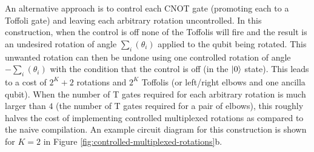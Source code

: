 An alternative approach is to control each CNOT gate (promoting each to a Toffoli gate) and leaving each arbitrary rotation uncontrolled.
In this construction, when the control is off none of the Toffolis will fire and the result is an undesired rotation of angle $\sum_{i} (\theta_i)$ applied to the qubit being rotated.
This unwanted rotation can then be undone using one controlled rotation of angle $- \sum_{i} (\theta_i)$ with the condition that the control is off (in the $\ket{0}$ state).
This leads to a cost of $2^K + 2$ rotations and $2^K$ Toffolis (or left/right elbows and one ancilla qubit).
When the number of T gates required for each arbitrary rotation is much larger than $4$ (the number of T gates required for a pair of elbows), this roughly halves the cost of implementing controlled multiplexed rotations as compared to the naive compilation.
An example circuit diagram for this construction is shown for $K = 2$ in Figure \ref{fig:controlled-multiplexed-rotations}b.